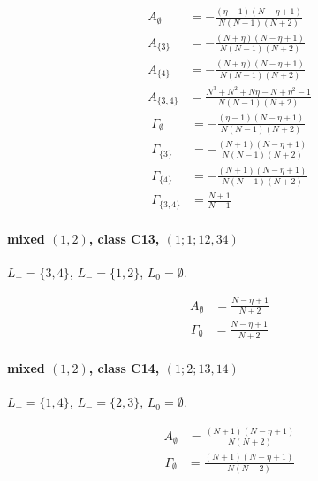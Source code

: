 \documentclass[11pt]{article}
\begin{document}
\begin{align*}
  A_{\emptyset} &= - \frac{\left(\eta - 1\right) \left(N - \eta + 1\right)}{N \left(N - 1\right) \left(N + 2\right)} \\
  A_{\{3\}} &= - \frac{\left(N + \eta\right) \left(N - \eta + 1\right)}{N \left(N - 1\right) \left(N + 2\right)} \\
  A_{\{4\}} &= - \frac{\left(N + \eta\right) \left(N - \eta + 1\right)}{N \left(N - 1\right) \left(N + 2\right)} \\
  A_{\{3,4\}} &= \frac{N^{3} + N^{2} + N \eta - N + \eta^{2} - 1}{N \left(N - 1\right) \left(N + 2\right)} 
\end{align*}
\begin{align*}
  \Gamma_{\emptyset} &= - \frac{\left(\eta - 1\right) \left(N - \eta + 1\right)}{N \left(N - 1\right) \left(N + 2\right)} \\
  \Gamma_{\{3\}} &= - \frac{\left(N + 1\right) \left(N - \eta + 1\right)}{N \left(N - 1\right) \left(N + 2\right)} \\
  \Gamma_{\{4\}} &= - \frac{\left(N + 1\right) \left(N - \eta + 1\right)}{N \left(N - 1\right) \left(N + 2\right)} \\
  \Gamma_{\{3,4\}} &= \frac{N + 1}{N - 1} 
\end{align*}

\paragraph{mixed $(1,2)$, class C13, $(1;1;12,34)$}

$L_+=\{3,4\}$, $L_-=\{1,2\}$, $L_0=\emptyset$.

\begin{align*}
  A_{\emptyset} &= \frac{N - \eta + 1}{N + 2} 
\end{align*}
\begin{align*}
  \Gamma_{\emptyset} &= \frac{N - \eta + 1}{N + 2} 
\end{align*}

\paragraph{mixed $(1,2)$, class C14, $(1;2;13,14)$}

$L_+=\{1,4\}$, $L_-=\{2,3\}$, $L_0=\emptyset$.

\begin{align*}
  A_{\emptyset} &= \frac{\left(N + 1\right) \left(N - \eta + 1\right)}{N \left(N + 2\right)} 
\end{align*}
\begin{align*}
  \Gamma_{\emptyset} &= \frac{\left(N + 1\right) \left(N - \eta + 1\right)}{N \left(N + 2\right)} 
\end{align*}
\end{document}
